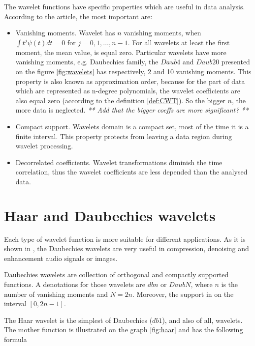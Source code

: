 The wavelet functions have specific properties which are useful in data analysis. According to the \cite{WaveletMethodsInDataMining} article, the most important are:

\begin{itemize}
\item Vanishing moments. Wavelet has $n$ vanishing moments, when $\int t^j \psi(t) dt=0$ for $j=0,1,\ldots,n-1$. For all wavelets at least the first moment, the mean value, is equal zero. Particular wavelets have more vanishing moments, e.g. Daubechies family, the $Daub4$ and $Daub20$ presented on the figure \ref{fig:wavelets} has respectively, 2 and 10 vanishing moments. This property is also known as approximation order, because for the part of data which are represented as n-degree polynomials, the wavelet coefficients are also equal zero (according to the definition \ref{def:CWT}). So the bigger $n$, the more data is neglected. \textit{** Add that the bigger coeffs are more significant? **}

\item Compact support. Wavelets domain is a compact set, most of the time it is a finite interval. This property protects from leaving a data region during wavelet processing.

\item Decorrelated coefficients. Wavelet transformations diminish the time correlation, thus the wavelet coefficients are less depended than the analysed data.
\end{itemize}


\section{Haar and Daubechies wavelets}

Each type of wavelet function is more suitable for different applications. As it is shown in \cite{APrimerOnWavelets}, the Daubechies wavelets are very useful in compression, denoising and enhancement audio signals or images.

\begin{defn}
Daubechies wavelets are collection of orthogonal and compactly supported functions. A denotations for those wavelets are $dbn$ or $DaubN$, where $n$ is the number of vanishing moments and $N=2n$. Moreover, the support in on the interval $[0, 2n-1]$.
\end{defn}

The Haar wavelet is the simplest of Daubechies ($db1$), and also of all, wavelets. The mother function is illustrated on the graph \ref{fig:haar} and has the following formula

